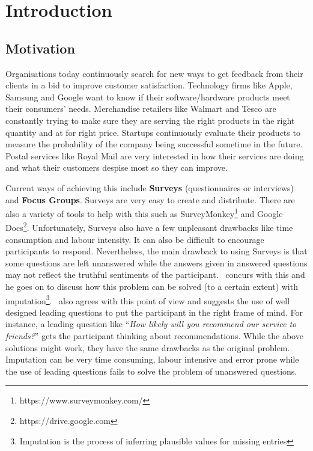 
\inbpdocument

\chapter{Introduction}
\label{cha:introduction}

\section{Motivation}
\label{sec:motivation}
Organisations today continuously search for new ways to get feedback from their clients in a bid to
improve customer satisfaction. Technology firms like Apple, Samsung and Google want to know if their
software/hardware products meet their consumers' needs. Merchandise retailers like Walmart and Tesco
are constantly trying to make sure they are serving the right products in the right quantity and at
for right price. Startups continuously evaluate their products to measure the probability of the
company being successful sometime in the future. Postal services like Royal Mail are very interested
in how their services are doing and what their customers despise most so they can improve.

Current ways of achieving this include \textbf{Surveys} (questionnaires or interviews) and
\textbf{Focus Groups}.  Surveys are very easy to create and distribute. There are also a variety of
tools to help with this such as SurveyMonkey\footnote{https://www.surveymonkey.com/} and Google
Docs\footnote{https://drive.google.com}. Unfortunately, Surveys also have a few unpleasant drawbacks
like time consumption and labour intensity. It can also be difficult to encourage participants to
respond. Nevertheless, the main drawback to using Surveys is that some questions are left unanswered
while the answers given in answered questions may not reflect the truthful sentiments of the
participant.~\citet{rubin1987} concurs with this and he goes on to discuss how this problem can be
solved (to a certain extent) with imputation\footnote{Imputation is the process of inferring
plausible values for missing entries}.~\citet{hayes2008} also agrees with this point of view and
suggests the use of well designed leading questions to put the participant in the right frame of
mind. For instance, a leading question like ``\textit{How likely will you recommend our service to
friends?}'' gets the participant thinking about recommendations. While the above solutions might
work, they have the same drawbacks as the original problem. Imputation can be very time consuming,
labour intensive and error prone while the use of leading questions fails to solve the problem of
unanswered questions.

